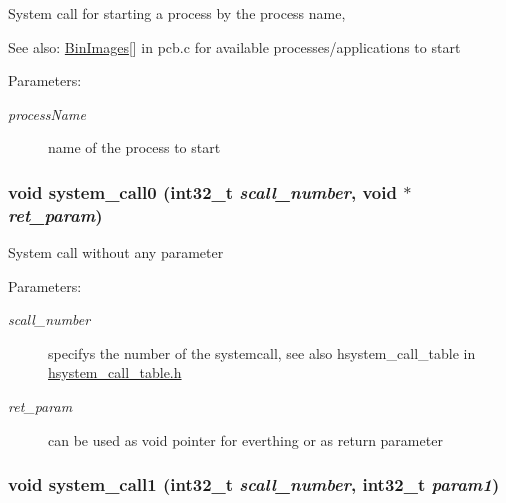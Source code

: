 System call for starting a process by the process name, \begin{Desc}
\item[See also:]\hyperlink{group___p_c_b_g186be0def8dfc704f43e446e25c5d5d4}{BinImages}\mbox{[}\mbox{]} in pcb.c for available processes/applications to start \end{Desc}
\begin{Desc}
\item[Parameters:]
\begin{description}
\item[{\em processName}]name of the process to start \end{description}
\end{Desc}
\hypertarget{group___h_s_y_s_t_e_m___a_p_i_gc2a14d9e7b11a7aadcbe3e2fecb920b8}{
\subsubsection[{system\_\-call0}]{\setlength{\rightskip}{0pt plus 5cm}void system\_\-call0 (int32\_\-t {\em scall\_\-number}, \/  void $\ast$ {\em ret\_\-param})}}
\label{group___h_s_y_s_t_e_m___a_p_i_gc2a14d9e7b11a7aadcbe3e2fecb920b8}


System call without any parameter \begin{Desc}
\item[Parameters:]
\begin{description}
\item[{\em scall\_\-number}]specifys the number of the systemcall, see also hsystem\_\-call\_\-table in \hyperlink{hsystem__call__table_8h}{hsystem\_\-call\_\-table.h} \item[{\em ret\_\-param}]can be used as void pointer for everthing or as return parameter \end{description}
\end{Desc}
\hypertarget{group___h_s_y_s_t_e_m___a_p_i_g9d47c8a4ca7ec749557ea6462f8c9fc8}{
\subsubsection[{system\_\-call1}]{\setlength{\rightskip}{0pt plus 5cm}void system\_\-call1 (int32\_\-t {\em scall\_\-number}, \/  int32\_\-t {\em param1})}}
\label{group___h_s_y_s_t_e_m___a_p_i_g9d47c8a4ca7ec749557ea6462f8c9fc8}


